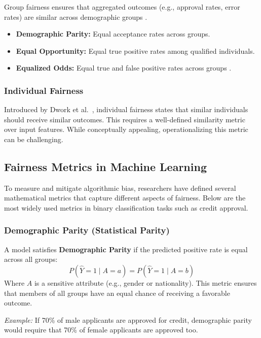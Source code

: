 Group fairness ensures that aggregated outcomes (e.g., approval rates, error rates) are similar across demographic groups \cite{hardt2016equality,mehrabi2021survey}.

\begin{itemize}
    \item \textbf{Demographic Parity:} Equal acceptance rates across groups.
    \item \textbf{Equal Opportunity:} Equal true positive rates among qualified individuals.
    \item \textbf{Equalized Odds:} Equal true and false positive rates across groups \cite{hardt2016equality}.
\end{itemize}

\subsubsection{Individual Fairness}

Introduced by Dwork et al.~\cite{dwork2012fairness}, individual fairness states that similar individuals should receive similar outcomes. This requires a well-defined similarity metric over input features. While conceptually appealing, operationalizing this metric can be challenging.

\subsection{Fairness Metrics in Machine Learning}

To measure and mitigate algorithmic bias, researchers have defined several mathematical metrics that capture different aspects of fairness. Below are the most widely used metrics in binary classification tasks such as credit approval.

\subsubsection{Demographic Parity (Statistical Parity)}

A model satisfies \textbf{Demographic Parity} if the predicted positive rate is equal across all groups:
\[
P(\hat{Y} = 1 \mid A = a) = P(\hat{Y} = 1 \mid A = b)
\]
Where $A$ is a sensitive attribute (e.g., gender or nationality). This metric ensures that members of all groups have an equal chance of receiving a favorable outcome.

\textit{Example:} If 70\% of male applicants are approved for credit, demographic parity would require that 70\% of female applicants are approved too.


